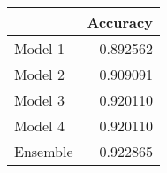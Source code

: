 \begin{tabular}{lr}
\toprule
{} &  Accuracy \\
\midrule
Model 1  &  0.892562 \\
Model 2  &  0.909091 \\
Model 3  &  0.920110 \\
Model 4  &  0.920110 \\
Ensemble &  0.922865 \\
\bottomrule
\end{tabular}
